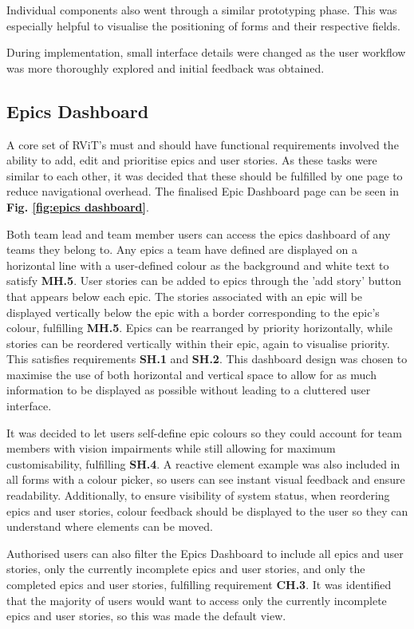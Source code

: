\documentclass[l4proj.tex]{subfiles}
\begin{document}
Individual components also went through a similar prototyping phase. This was especially helpful to visualise the positioning of forms and their respective fields. 

During implementation, small interface details were changed as the user workflow was more thoroughly explored and initial feedback was obtained.



\subsection{Epics Dashboard}
A core set of RViT's must and should have functional requirements involved the ability to add, edit and prioritise epics and user stories. As these tasks were similar to each other, it was decided that these should be fulfilled by one page to reduce navigational overhead. The finalised Epic Dashboard page can be seen in \textbf{Fig. \ref{fig:epics dashboard}}.

Both team lead and team member users can access the epics dashboard of any teams they belong to. Any epics a team have defined are displayed on a horizontal line with a user-defined colour as the background and white text to satisfy \textbf{MH.5}.  User stories can be added to epics through the 'add story' button that appears below each epic. The stories associated with an epic will be displayed vertically below the epic with a border corresponding to the epic's colour, fulfilling \textbf{MH.5}. Epics can be rearranged by priority horizontally, while stories can be reordered vertically within their epic, again to visualise priority. This satisfies requirements \textbf{SH.1} and \textbf{SH.2}. This dashboard design was chosen to maximise the use of both horizontal and vertical space to allow for as much information to be displayed as possible without leading to a cluttered user interface.

It was decided to let users self-define epic colours so they could account for team members with vision impairments while still allowing for maximum customisability, fulfilling \textbf{SH.4}. A reactive element example was also included in all forms with a colour picker, so users can see instant visual feedback and ensure readability. Additionally, to ensure visibility of system status, when reordering epics and user stories, colour feedback should be displayed to the user so they can understand where elements can be moved.

Authorised users can also filter the Epics Dashboard to include all epics and user stories, only the currently incomplete epics and user stories, and only the completed epics and user stories, fulfilling requirement \textbf{CH.3}. It was identified that the majority of users would want to access only the currently incomplete epics and user stories, so this was made the default view.
\end{document}
